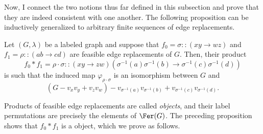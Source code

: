 Now, I connect the two notions thus far defined in this subsection and prove that they are indeed consistent with one another.
The following proposition can be inductively generalized to arbitrary finite sequences of edge replacements.

\begin{proposition}\label{prop:fer-is-well-defined}
    Let $(G,\lambda)$ be a labeled graph and suppose that $f_0=\sigma::(xy\to wz)$ and $f_1=\rho::(ab\to cd)$ are feasible edge replacements of $G$.
    Then, their product $$f_0*f_1=\rho\cdot\sigma::(xy\to zw)(\sigma^{-1}(a)\sigma^{-1}(b)\to\sigma^{-1}(c)\sigma^{-1}(d))$$ is such that the induced map $\varphi_{\rho\cdot\sigma}$ is an isomorphism between $G$ and $$(G-v_xv_y+v_zv_w)-v_{\sigma^{-1}(a)}v_{\sigma^{-1}(b)}+v_{\sigma^{-1}(c)}v_{\sigma^{-1}(d)}.$$
\end{proposition}

Products of feasible edge replacements are called \tfer \emph{objects}, and their label permutations are precisely the elements of $\Fer(G)$.
The preceding proposition shows that $f_0*f_1$ is a \tfer object, which we prove as follows.

